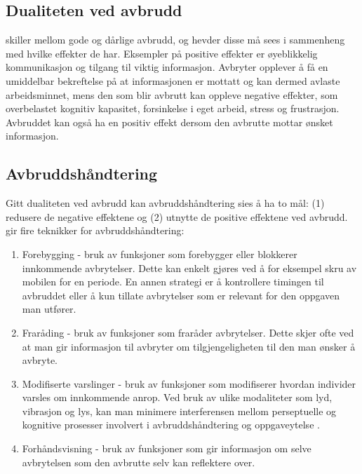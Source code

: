 \subsection{Dualiteten ved avbrudd}
\label{sec:dualitet}
\citet{Grundgeiger09} skiller mellom gode og dårlige avbrudd, og hevder disse må sees i sammenheng med hvilke effekter de har. Eksempler på positive effekter er øyeblikkelig kommunikasjon og tilgang til viktig informasjon. Avbryter opplever å få en umiddelbar bekreftelse på at informasjonen er mottatt og kan dermed avlaste arbeidsminnet, mens den som blir avbrutt kan oppleve negative effekter, som overbelastet kognitiv kapasitet, forsinkelse i eget arbeid, stress og frustrasjon. Avbruddet kan også ha en positiv effekt dersom den avbrutte mottar ønsket informasjon.

\subsection{Avbruddshåndtering}
\label{sec:håndtering}
Gitt dualiteten ved avbrudd kan avbruddshåndtering sies å ha to mål: (1) redusere de negative effektene og (2) utnytte de positive effektene ved avbrudd. \citet{Grandhi10} gir fire teknikker for avbruddshåndtering:
\begin{enumerate}        
\item Forebygging - bruk av funksjoner som forebygger eller blokkerer innkommende avbrytelser. Dette kan enkelt gjøres ved å for eksempel skru av mobilen for en periode. En annen strategi er å kontrollere timingen til avbruddet eller å kun tillate avbrytelser som er relevant for den oppgaven man utfører.

\item Fraråding - bruk av funksjoner som fraråder avbrytelser. Dette skjer ofte ved at man gir informasjon til avbryter om tilgjengeligheten til den man ønsker å avbryte. 

\item Modifiserte varslinger - bruk av funksjoner som modifiserer hvordan individer varsles om innkommende anrop. Ved bruk av ulike modaliteter som lyd, vibrasjon og lys, kan man minimere interferensen mellom perseptuelle og kognitive prosesser involvert i avbruddshåndtering og oppgaveytelse \citep{Harr07}.

\item Forhåndsvisning - bruk av funksjoner som gir informasjon om selve avbrytelsen som den avbrutte selv kan reflektere over.   
\end{enumerate}

